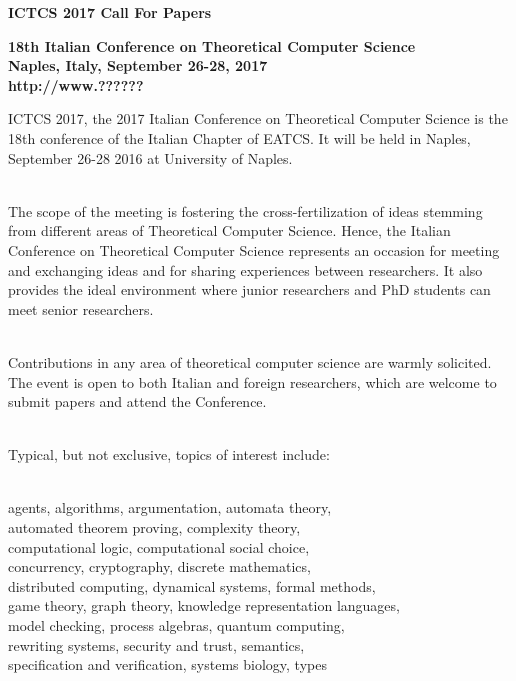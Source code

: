 \documentclass[11pt]{article}
\begin{document}
\begin{spacing}{1.25}
\begin{center}
  {\large \bf ICTCS 2017 Call For Papers}
\end{center}


\begin{center}
  {\bf 18th Italian Conference on Theoretical Computer Science}\\
  {\bf Naples, Italy, September 26-28, 2017}\\
  {\bf http://www.??????}
\end{center}
\end{spacing}

\begin{spacing}{1}
  
ICTCS 2017, the 2017 Italian Conference on Theoretical Computer
Science is the 18th conference of the Italian Chapter of EATCS. It
will be held in Naples, September 26-28 2016 at University of Naples.

~\\
The scope of the meeting is fostering the cross-fertilization of ideas
stemming from different areas of Theoretical Computer Science. Hence,
the Italian Conference on Theoretical Computer Science represents an
occasion for meeting and exchanging ideas and for sharing experiences
between researchers. It also provides the ideal environment where
junior researchers and PhD students can meet senior researchers.

~\\
Contributions in any area of theoretical computer science are warmly
solicited. The event is open to both Italian and foreign researchers,
which are welcome to submit papers and attend the Conference.

~\\
Typical, but not exclusive, topics of interest include:

~\\
\indent\indent agents, algorithms, argumentation, automata theory, \\
\indent\indent automated theorem proving, complexity theory,\\
\indent\indent computational logic, computational social choice, \\
\indent\indent concurrency, cryptography, discrete mathematics, \\
\indent\indent distributed computing, dynamical systems, formal methods, \\
\indent\indent  game theory, graph theory, knowledge representation languages,\\
\indent\indent model checking, process algebras, quantum computing,\\
\indent\indent rewriting systems, security and trust, semantics,\\
\indent\indent specification and verification, systems biology, types



\end{spacing}
\end{document}
